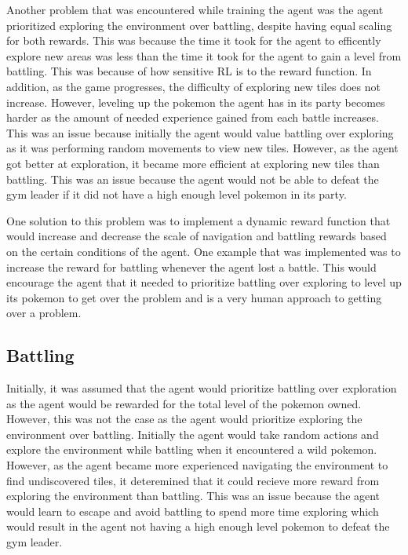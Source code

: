 Another problem that was encountered while training the agent was the agent prioritized exploring the environment over battling, despite having equal scaling for both rewards. This was because the time it took for the agent to efficently explore new areas was less than the time it took for the agent to gain a level from battling. This was because of how sensitive RL is to the reward function. In addition, as the game progresses, the difficulty of exploring new tiles does not increase. However, leveling up the pokemon the agent has in its party becomes harder as the amount of needed experience gained from each battle increases. This was an issue because initially the agent would value battling over exploring as it was performing random movements to view new tiles. However, as the agent got better at exploration, it became more efficient at exploring new tiles than battling. This was an issue because the agent would not be able to defeat the gym leader if it did not have a high enough level pokemon in its party. 

One solution to this problem was to implement a dynamic reward function that would increase and decrease the scale of navigation and battling rewards based on the certain conditions of the agent. One example that was implemented was to increase the reward for battling whenever the agent lost a battle. This would encourage the agent that it needed to prioritize battling over exploring to level up its pokemon to get over the problem and is a very human approach to getting over a problem. 

\subsection{Battling}

Initially, it was assumed that the agent would prioritize battling over exploration as the agent would be rewarded for the total level of the pokemon owned. However, this was not the case as the agent would prioritize exploring the environment over battling. Initially the agent would take random actions and explore the environment while battling when it encountered a wild pokemon. However, as the agent became more experienced navigating the environment to find undiscovered tiles, it deteremined that it could recieve more reward from exploring the environment than battling. This was an issue because the agent would learn to escape and avoid battling to spend more time exploring which would result in the agent not having a high enough level pokemon to defeat the gym leader. 

